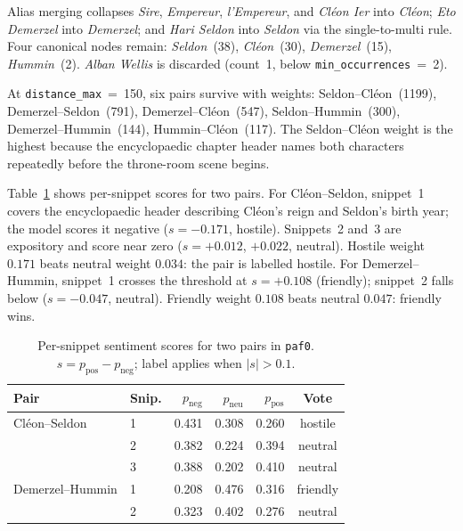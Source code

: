 \documentclass[a4paper]{article}
\begin{document}
Alias merging collapses \textit{Sire}, \textit{Empereur},
\textit{l'Empereur}, and \textit{Cléon Ier} into \textit{Cléon};
\textit{Eto Demerzel} into \textit{Demerzel}; and \textit{Hari
Seldon} into \textit{Seldon} via the single-to-multi rule.
Four canonical nodes remain: \textit{Seldon}~(38),
\textit{Cléon}~(30), \textit{Demerzel}~(15), \textit{Hummin}~(2).
\textit{Alban Wellis} is discarded (count~1, below
\texttt{min\_occurrences}~=~2).

At \texttt{distance\_max}~=~150, six pairs survive with weights:
Seldon--Cléon~(1199), Demerzel--Seldon~(791),
Demerzel--Cléon~(547), Seldon--Hummin~(300),
Demerzel--Hummin~(144), Hummin--Cléon~(117). The Seldon--Cléon
weight is the highest because the encyclopaedic chapter header
names both characters repeatedly before the throne-room scene
begins.

Table~\ref{tab:scores} shows per-snippet scores for two pairs.
For Cléon--Seldon, snippet~1 covers the encyclopaedic header
describing Cléon's reign and Seldon's birth year; the model scores
it negative ($s = -0.171$, hostile). Snippets~2 and~3 are
expository and score near zero ($s = +0.012$, $+0.022$, neutral).
Hostile weight $0.171$ beats neutral weight $0.034$: the pair is
labelled hostile. For Demerzel--Hummin, snippet~1 crosses the
threshold at $s = +0.108$ (friendly); snippet~2 falls below
($s = -0.047$, neutral). Friendly weight $0.108$ beats neutral
$0.047$: friendly wins.

\begin{table}[h]
\centering
\caption{Per-snippet sentiment scores for two pairs in \texttt{paf0}.
$s = p_{\text{pos}} - p_{\text{neg}}$; label applies when $|s|>0.1$.}
\label{tab:scores}
\setlength{\tabcolsep}{3pt}
\small
\begin{tabular}{llrrrc}
\toprule
\textbf{Pair} & \textbf{Snip.} & $p_{\text{neg}}$ & $p_{\text{neu}}$ & $p_{\text{pos}}$ & \textbf{Vote} \\
\midrule
Cléon--Seldon   & 1 & 0.431 & 0.308 & 0.260 & hostile \\
                & 2 & 0.382 & 0.224 & 0.394 & neutral \\
                & 3 & 0.388 & 0.202 & 0.410 & neutral \\
\midrule
Demerzel--Hummin & 1 & 0.208 & 0.476 & 0.316 & friendly \\
                 & 2 & 0.323 & 0.402 & 0.276 & neutral \\
\bottomrule
\end{tabular}
\end{table}
\end{document}
